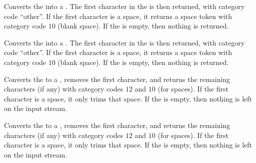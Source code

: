 \documentclass[oneside]{book}
\begin{document}
\begin{function}{\strHead}
\begin{syntax}
 
\end{syntax}
Converts the  into a .
The first character in the  is then returned,
with category code \enquote{other}. If the first character is a space,
it returns a space token with category code $10$ (blank space).
If the  is empty, then nothing is returned.
\begin{demohigh}
\end{demohigh}
\end{function}

\begin{function}{\strVarHead}
\begin{syntax}
 
\end{syntax}
Converts the  into a .
The first character in the  is then returned,
with category code \enquote{other}. If the first character is a space,
it returns a space token with category code $10$ (blank space).
If the  is empty, then nothing is returned.
\begin{demohigh}
\strSet {}
\strVarHead \lTmpaStr
\end{demohigh}
\end{function}

\begin{function}{\strTail}
\begin{syntax}
 
\end{syntax}
Converts the  to a , removes the first
character, and returns the remaining characters (if any)
with category codes $12$ and $10$ (for spaces).
If the first character is a space, it only trims that space.
If the  is empty,
then nothing is left on the input stream.
\begin{demohigh}
\end{demohigh}
\end{function}

\begin{function}{\strVarTail}
\begin{syntax}
 
\end{syntax}
Converts the  to a , removes the first
character, and returns the remaining characters (if any)
with category codes $12$ and $10$ (for spaces).
If the first character is a space, it only trims that space.
If the  is empty,
then nothing is left on the input stream.
\begin{demohigh}
\strSet {}
\strVarTail \lTmpaStr
\end{demohigh}
\end{function}
\end{document}
